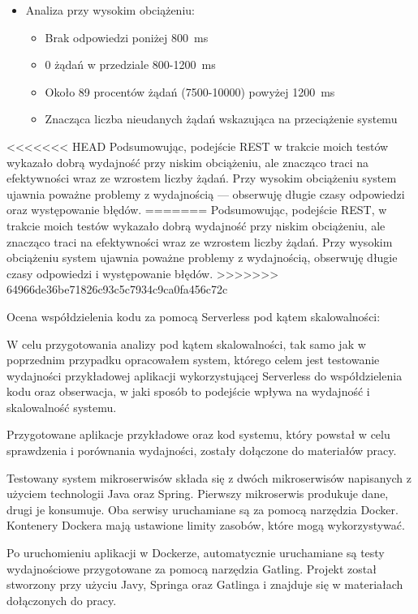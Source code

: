 \documentclass[runningheads,12pt]{llncs}
\begin{document}
\begin{itemize}
  \item Analiza przy wysokim obciążeniu:
  \begin{itemize}
    \item Brak odpowiedzi poniżej 800~ms
    \item 0 żądań w przedziale 800-1200~ms
    \item Około 89 procentów żądań (7500-10000) powyżej 1200~ms
    \item Znacząca liczba nieudanych żądań wskazująca na przeciążenie systemu
  \end{itemize}
\end{itemize}

<<<<<<< HEAD
Podsumowując, podejście REST w trakcie moich testów wykazało dobrą wydajność przy niskim obciążeniu, ale znacząco traci na efektywności wraz ze wzrostem liczby żądań. Przy wysokim obciążeniu system ujawnia poważne problemy z wydajnością — obserwuję długie czasy odpowiedzi oraz występowanie błędów.
=======
Podsumowując, podejście REST, w trakcie moich testów wykazało dobrą wydajność przy niskim obciążeniu, ale znacząco traci na efektywności wraz ze wzrostem liczby żądań. Przy wysokim obciążeniu system ujawnia poważne problemy z wydajnością, obserwuję długie czasy odpowiedzi i występowanie błędów.
>>>>>>> 64966de36be71826c93c5c7934c9ca0fa456c72c

\newpage



Ocena współdzielenia kodu za pomocą Serverless pod kątem skalowalności:

W celu przygotowania analizy pod kątem skalowalności, tak samo jak w poprzednim przypadku opracowałem system, którego celem jest testowanie wydajności przykładowej aplikacji wykorzystującej Serverless do współdzielenia kodu oraz obserwacja, w jaki sposób to podejście wpływa na wydajność i skalowalność systemu.

Przygotowane aplikacje przykładowe oraz kod systemu, który powstał w celu sprawdzenia i porównania wydajności, zostały dołączone do materiałów pracy.

Testowany system mikroserwisów składa się z dwóch mikroserwisów napisanych z użyciem technologii Java oraz Spring. Pierwszy mikroserwis produkuje dane, drugi je konsumuje. Oba serwisy uruchamiane są za pomocą narzędzia Docker. Kontenery Dockera mają ustawione limity zasobów, które mogą wykorzystywać.

Po uruchomieniu aplikacji w Dockerze, automatycznie uruchamiane są testy wydajnościowe przygotowane za pomocą narzędzia Gatling. Projekt został stworzony przy użyciu Javy, Springa oraz Gatlinga i znajduje się w materiałach dołączonych do pracy.
\end{document}
